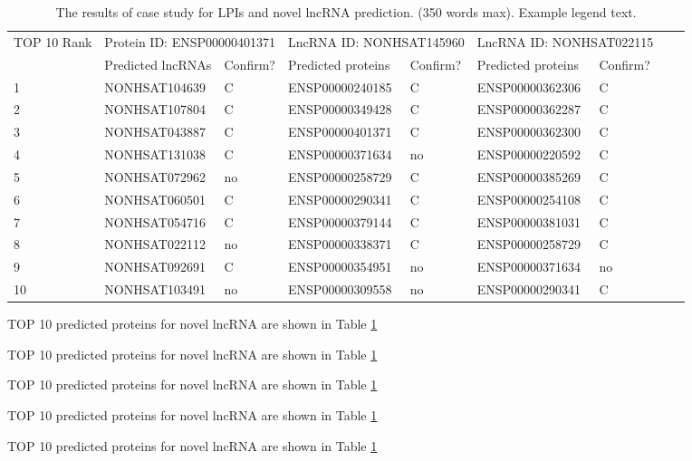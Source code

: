\documentclass[fleqn,10pt]{wlscirep}
\begin{document}
\begin{table}[ht]
\centering
\caption{\label{tab:caseStudy1} The results of case study for LPIs and novel lncRNA prediction. (350 words max). Example legend text.}
\begin{tabular}{|l|l|l|l|l|l|l|l|l|}
\hline
\multirow{2}{*}{TOP 10 Rank} & \multicolumn{2}{|l|}{Protein ID: ENSP00000401371} & \multicolumn{2}{|l|}{LncRNA ID: NONHSAT145960}& \multicolumn{2}{|l|}{LncRNA ID: NONHSAT022115}\\
\cline{2-7}
 & Predicted lncRNAs & Confirm? & Predicted proteins & Confirm? & Predicted proteins & Confirm? \\
\hline
1 & NONHSAT104639  & C & ENSP00000240185 & C & ENSP00000362306 & C
\\
2 & NONHSAT107804 & C & ENSP00000349428	& C & ENSP00000362287 & 	C
\\
3 & NONHSAT043887  & C & ENSP00000401371	& C & ENSP00000362300 & 	C
\\
4 & NONHSAT131038  & C & ENSP00000371634	& no & ENSP00000220592  & C
\\
5 & NONHSAT072962  & no & ENSP00000258729 & C & ENSP00000385269  & C
\\
6 & NONHSAT060501  & C & ENSP00000290341	& C & ENSP00000254108  & C
\\
7 & NONHSAT054716 & C & ENSP00000379144 & C & ENSP00000381031 & C
\\
8 & NONHSAT022112 & no & ENSP00000338371 & C & ENSP00000258729 & C
\\
9 & NONHSAT092691 & C & ENSP00000354951	& no & ENSP00000371634 & no
\\
10 & NONHSAT103491 & no & ENSP00000309558 & no & ENSP00000290341  & C
\\
\hline
\end{tabular}
\end{table}

TOP 10 predicted proteins for novel lncRNA are shown in Table \ref{tab:caseStudy1}

TOP 10 predicted proteins for novel lncRNA are shown in Table \ref{tab:caseStudy1}

TOP 10 predicted proteins for novel lncRNA are shown in Table \ref{tab:caseStudy1}

TOP 10 predicted proteins for novel lncRNA are shown in Table \ref{tab:caseStudy1}

TOP 10 predicted proteins for novel lncRNA are shown in Table \ref{tab:caseStudy1}
\end{document}
